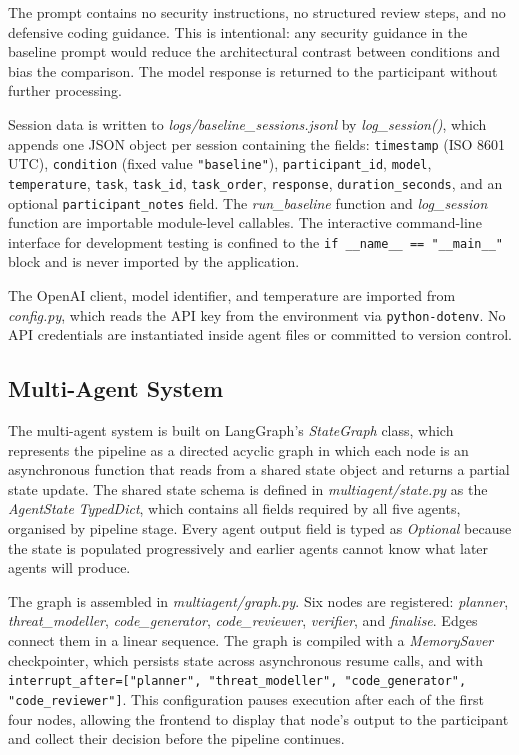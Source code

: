 The prompt contains no security instructions, no structured review steps, and no defensive coding guidance. This is intentional: any security guidance in the baseline prompt would reduce the architectural contrast between conditions and bias the comparison. The model response is returned to the participant without further processing.

Session data is written to \textit{logs/baseline\_sessions.jsonl} by \textit{log\_session()}, which appends one JSON object per session containing the fields: \texttt{timestamp} (ISO 8601 UTC), \texttt{condition} (fixed value \texttt{"baseline"}), \texttt{participant\_id}, \texttt{model}, \texttt{temperature}, \texttt{task}, \texttt{task\_id}, \texttt{task\_order}, \texttt{response}, \texttt{duration\_seconds}, and an optional \texttt{participant\_notes} field. The \textit{run\_baseline} function and \textit{log\_session} function are importable module-level callables. The interactive command-line interface for development testing is confined to the \texttt{if \_\_name\_\_ == "\_\_main\_\_"} block and is never imported by the application.

The OpenAI client, model identifier, and temperature are imported from \textit{config.py}, which reads the API key from the environment via \texttt{python-dotenv}. No API credentials are instantiated inside agent files or committed to version control.

\subsection{Multi-Agent System}

The multi-agent system is built on LangGraph's \textit{StateGraph} class, which represents the pipeline as a directed acyclic graph in which each node is an asynchronous function that reads from a shared state object and returns a partial state update. The shared state schema is defined in \textit{multiagent/state.py} as the \textit{AgentState} \textit{TypedDict}, which contains all fields required by all five agents, organised by pipeline stage. Every agent output field is typed as \textit{Optional} because the state is populated progressively and earlier agents cannot know what later agents will produce.

The graph is assembled in \textit{multiagent/graph.py}. Six nodes are registered: \textit{planner}, \textit{threat\_modeller}, \textit{code\_generator}, \textit{code\_reviewer}, \textit{verifier}, and \textit{finalise}. Edges connect them in a linear sequence. The graph is compiled with a \textit{MemorySaver} checkpointer, which persists state across asynchronous resume calls, and with \texttt{interrupt\_after=["planner", "threat\_modeller", "code\_generator", "code\_reviewer"]}. This configuration pauses execution after each of the first four nodes, allowing the frontend to display that node's output to the participant and collect their decision before the pipeline continues.


